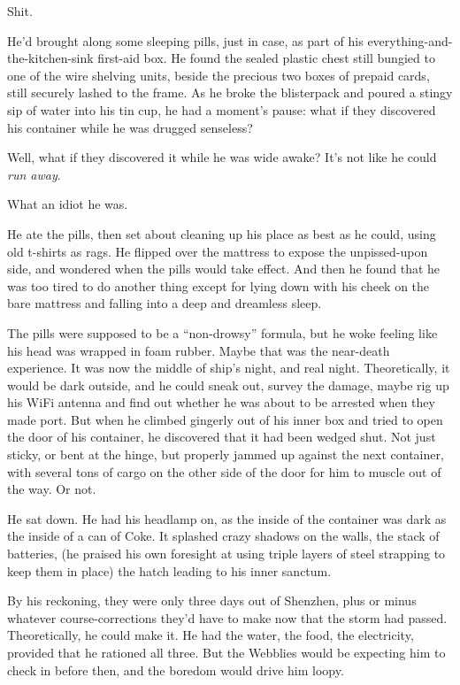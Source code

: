 Shit.

He'd brought along some sleeping pills, just in case, as part of
his everything-and-the-kitchen-sink first-aid box. He found the
sealed plastic chest still bungied to one of the wire shelving
units, beside the precious two boxes of prepaid cards, still
securely lashed to the frame. As he broke the blisterpack and
poured a stingy sip of water into his tin cup, he had a moment's
pause: what if they discovered his container while he was drugged
senseless?

Well, what if they discovered it while he was wide awake? It's not
like he could \emph{run away}.

What an idiot he was.

He ate the pills, then set about cleaning up his place as best as
he could, using old t-shirts as rags. He flipped over the mattress
to expose the unpissed-upon side, and wondered when the pills would
take effect. And then he found that he was too tired to do another
thing except for lying down with his cheek on the bare mattress and
falling into a deep and dreamless sleep.

The pills were supposed to be a ``non-drowsy'' formula, but he woke
feeling like his head was wrapped in foam rubber. Maybe that was
the near-death experience. It was now the middle of ship's night,
and real night. Theoretically, it would be dark outside, and he
could sneak out, survey the damage, maybe rig up his WiFi antenna
and find out whether he was about to be arrested when they made
port. But when he climbed gingerly out of his inner box and tried
to open the door of his container, he discovered that it had been
wedged shut. Not just sticky, or bent at the hinge, but properly
jammed up against the next container, with several tons of cargo on
the other side of the door for him to muscle out of the way. Or
not.

He sat down. He had his headlamp on, as the inside of the container
was dark as the inside of a can of Coke. It splashed crazy shadows
on the walls, the stack of batteries, (he praised his own foresight
at using triple layers of steel strapping to keep them in place)
the hatch leading to his inner sanctum.

By his reckoning, they were only three days out of Shenzhen, plus
or minus whatever course-corrections they'd have to make now that
the storm had passed. Theoretically, he could make it. He had the
water, the food, the electricity, provided that he rationed all
three. But the Webblies would be expecting him to check in before
then, and the boredom would drive him loopy.

